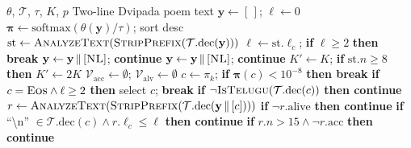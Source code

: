 \documentclass[11pt]{article}
\begin{document}

\begin{algorithm}[H]
\caption{Strategy~1: Rejection Sampling}
\label{alg:rejection-sampling}
\scriptsize
\begin{algorithmic}[1]
\Require $\theta$, $\mathcal{T}$, $\tau$, $K$, $p$
\Ensure Two-line Dvipada poem text
\State $\mathbf{y} \gets [\,]$;\; $\ell \gets 0$
    \State $\boldsymbol{\pi} \gets
           \text{softmax}(\theta(\mathbf{y})/\tau)$;\;
           sort desc
    \State $\text{st} \gets \textsc{AnalyzeText}(
           \textsc{StripPrefix}(
           \mathcal{T}.\text{dec}(\mathbf{y})))$
    \State $\ell \gets \text{st}.\ell_c$;\;
           \textbf{if} $\ell \ge 2$ \textbf{then break}
    \State {}
        \State $\mathbf{y} \gets \mathbf{y} \,\|\,
               [\textsc{NL}]$;\; \textbf{continue}
    \EndIf
        \State $\mathbf{y} \gets \mathbf{y} \,\|\,
               [\textsc{NL}]$;\; \textbf{continue}
    \EndIf
    \State $K' \gets K$;\;
           \textbf{if} $\text{st}.n \ge 8$
           \textbf{then} $K' \gets 2K$
    \State {}
    \State $\mathcal{V}_{\text{acc}} \gets \emptyset$;\;
           $\mathcal{V}_{\text{alv}} \gets \emptyset$
        \State $c \gets \pi_k$;\;
               \textbf{if} $\boldsymbol{\pi}(c) < 10^{-8}$
               \textbf{then break}
        \State \textbf{if} $c = \textsc{Eos} \wedge
               \ell \ge 2$ \textbf{then} select $c$;
               \textbf{break}
        \State \textbf{if} $\neg\textsc{IsTelugu}(
               \mathcal{T}.\text{dec}(c))$
               \textbf{then continue}
        \State $r \gets \textsc{AnalyzeText}(
               \textsc{StripPrefix}(
               \mathcal{T}.\text{dec}(
               \mathbf{y} \,\|\, [c])))$
        \State \textbf{if} $\neg r.\text{alive}$
               \textbf{then continue}
        \State \textbf{if} ``\textbackslash n''
               $\in \mathcal{T}.\text{dec}(c)
               \wedge r.\ell_c \le \ell$
               \textbf{then continue}
        \State \textbf{if} $r.n > 15 \wedge
               \neg r.\text{acc}$
               \textbf{then continue}

\end{algorithmic}
\end{algorithm}
\end{document}
